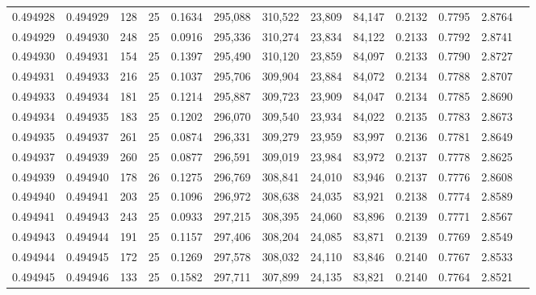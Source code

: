 \begin{tabular}{rrrrrrrrrrrrr}
0.494928 & 0.494929 &   128 &  25 &                                     0.1634 & 295,088 & 310,522 &  23,809 &  84,147 & 0.2132 & 0.7795 & 2.8764 \\
0.494929 & 0.494930 &   248 &  25 &                                     0.0916 & 295,336 & 310,274 &  23,834 &  84,122 & 0.2133 & 0.7792 & 2.8741 \\
0.494930 & 0.494931 &   154 &  25 &                                     0.1397 & 295,490 & 310,120 &  23,859 &  84,097 & 0.2133 & 0.7790 & 2.8727 \\
0.494931 & 0.494933 &   216 &  25 &                                     0.1037 & 295,706 & 309,904 &  23,884 &  84,072 & 0.2134 & 0.7788 & 2.8707 \\
0.494933 & 0.494934 &   181 &  25 &                                     0.1214 & 295,887 & 309,723 &  23,909 &  84,047 & 0.2134 & 0.7785 & 2.8690 \\
0.494934 & 0.494935 &   183 &  25 &                                     0.1202 & 296,070 & 309,540 &  23,934 &  84,022 & 0.2135 & 0.7783 & 2.8673 \\
0.494935 & 0.494937 &   261 &  25 &                                     0.0874 & 296,331 & 309,279 &  23,959 &  83,997 & 0.2136 & 0.7781 & 2.8649 \\
0.494937 & 0.494939 &   260 &  25 &                                     0.0877 & 296,591 & 309,019 &  23,984 &  83,972 & 0.2137 & 0.7778 & 2.8625 \\
0.494939 & 0.494940 &   178 &  26 &                                     0.1275 & 296,769 & 308,841 &  24,010 &  83,946 & 0.2137 & 0.7776 & 2.8608 \\
0.494940 & 0.494941 &   203 &  25 &                                     0.1096 & 296,972 & 308,638 &  24,035 &  83,921 & 0.2138 & 0.7774 & 2.8589 \\
0.494941 & 0.494943 &   243 &  25 &                                     0.0933 & 297,215 & 308,395 &  24,060 &  83,896 & 0.2139 & 0.7771 & 2.8567 \\
0.494943 & 0.494944 &   191 &  25 &                                     0.1157 & 297,406 & 308,204 &  24,085 &  83,871 & 0.2139 & 0.7769 & 2.8549 \\
0.494944 & 0.494945 &   172 &  25 &                                     0.1269 & 297,578 & 308,032 &  24,110 &  83,846 & 0.2140 & 0.7767 & 2.8533 \\
0.494945 & 0.494946 &   133 &  25 &                                     0.1582 & 297,711 & 307,899 &  24,135 &  83,821 & 0.2140 & 0.7764 & 2.8521 \\

\end{tabular}
